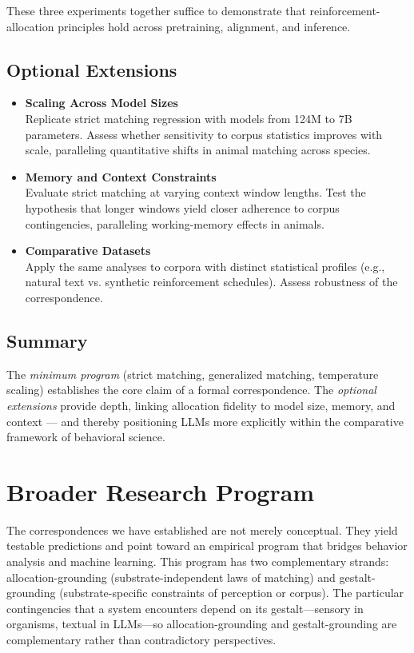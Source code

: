 \documentclass[11pt]{article}
\begin{document}
These three experiments together suffice to demonstrate that
reinforcement-allocation principles hold across pretraining, alignment,
and inference.

\subsection{Optional Extensions}

\begin{itemize}
\item \textbf{Scaling Across Model Sizes} \\
  Replicate strict matching regression with models from 124M to 7B
  parameters. Assess whether sensitivity to corpus statistics improves
  with scale, paralleling quantitative shifts in animal matching across
  species.

\item \textbf{Memory and Context Constraints} \\
  Evaluate strict matching at varying context window lengths. Test the
  hypothesis that longer windows yield closer adherence to corpus
  contingencies, paralleling working-memory effects in animals.

\item \textbf{Comparative Datasets} \\
  Apply the same analyses to corpora with distinct statistical profiles
  (e.g., natural text vs. synthetic reinforcement schedules). Assess
  robustness of the correspondence.
\end{itemize}

\subsection{Summary}
The \emph{minimum program} (strict matching, generalized matching,
temperature scaling) establishes the core claim of a formal
correspondence. The \emph{optional extensions} provide depth, linking
allocation fidelity to model size, memory, and context --- and thereby
positioning LLMs more explicitly within the comparative framework of
behavioral science.

\section{Broader Research Program}
\label{sec:program}

The correspondences we have established are not merely conceptual. They yield
testable predictions and point toward an empirical program that bridges behavior
analysis and machine learning. This program has two complementary strands:
allocation-grounding (substrate-independent laws of matching) and
gestalt-grounding (substrate-specific constraints of perception or corpus).
The
particular contingencies that a system encounters depend on its
gestalt---sensory in organisms, textual in LLMs---so
allocation-grounding and gestalt-grounding are complementary rather than
contradictory perspectives. 
\end{document}
